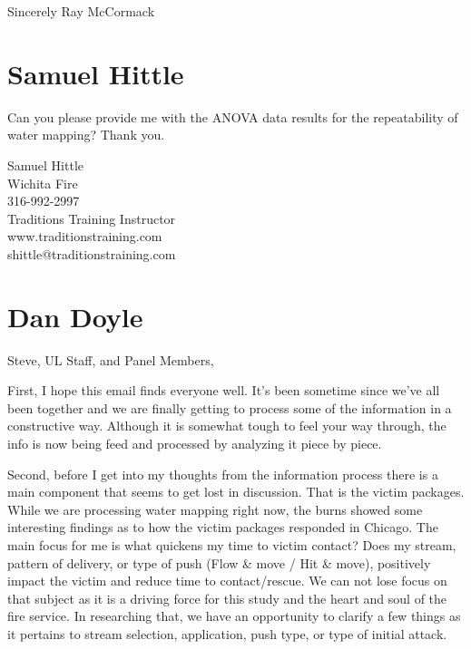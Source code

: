 \documentclass[12pt,oneside]{book}
\begin{document}
\begin{appendix}
Sincerely
Ray McCormack

\section{Samuel Hittle}

Can you please provide me with the ANOVA data results for the repeatability of water mapping? Thank you.

Samuel Hittle \\
Wichita Fire \\
316-992-2997 \\
Traditions Training Instructor \\
www.traditionstraining.com  \\
shittle@traditionstraining.com \\

\section{Dan Doyle}

Steve, UL Staff, and Panel Members,
 
 
First, I hope this email finds everyone well.  It's been sometime since we've all been together and we are finally getting to process some of the information in a constructive way.  Although it is somewhat tough to feel your way through, the info is now being feed and processed by analyzing it piece by piece.  
 
Second, before I get into my thoughts from the information process there is a main component that seems to get lost in discussion.  That is the victim packages.  While we are processing water mapping right now, the burns showed some interesting findings as to how the victim packages responded in Chicago.  The main focus for me is what quickens my time to victim contact? Does my stream, pattern of delivery, or type of push (Flow \& move / Hit \& move), positively impact the victim and reduce time to contact/rescue.  We can not lose focus on that subject as it is a driving force for this study and the heart and soul of the fire service.  In researching that, we have an opportunity to clarify a few things as it pertains to stream selection, application, push type, or type of initial attack.
 

\end{appendix}
\end{document}
